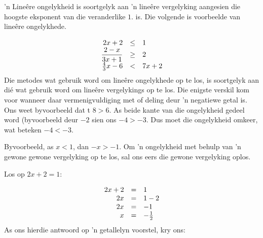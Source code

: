 


’n Lineêre ongelykheid is soortgelyk aan ’n lineêre vergelyking aangesien die hoogste eksponent van die veranderlike $1$. is. Die volgende is voorbeelde van lineêre ongelykhede.\par 

\begin{equation*}
\begin{array}{ccc}\hfill 2x+2& \leq& 1\hfill \\ \hfill \dfrac{2-x}{3x+1}&\geq& 2\hfill \\ \hfill \frac{4}{3}x-6&<& 7x+2\hfill \end{array}
\end{equation*}
Die metodes wat gebruik word om lineêre ongelykhede op te los, is soortgelyk aan dié wat gebruik word om
lineêre vergelykings op te los. Die enigste verskil kom voor wanneer daar vermenigvuldiging met of deling
deur ’n negatiewe getal is. Ons weet byvoorbeeld dat
t $8>6$. As beide kante van die ongelykheid gedeel word (byvoorbeeld deur  $-2$ sien ons $-4 > -3$. Dus moet die ongelykheid omkeer, wat beteken
$-4<-3$.



Byvoorbeeld, as  $x<1$, dan $-x>-1$.
Om ’n ongelykheid met behulp van 'n gewone gewone vergelyking op te los, sal ons eers die gewone vergelyking oplos.\par
 Los op $2x+2=1$:

\begin{equation*}
\begin{array}{ccl}\hfill 2x+2& =& 1\hfill \\ \hfill 2x& =& 1-2\hfill \\ \hfill 2x& =& -1\hfill \\ \hfill x& =& -\frac{1}{2}\hfill \end{array}
\end{equation*}
As ons hierdie antwoord op ’n getallelyn voorstel, kry ons:\par 

